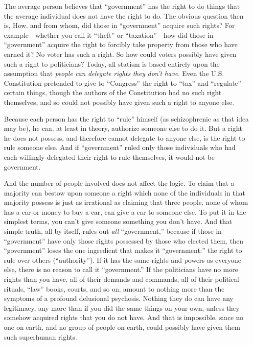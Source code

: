 \documentclass{book}
\begin{document}
The average person believes that \enquote{government} has the right to do things that the average individual does not have the right to do. The obvious question then is, How, and from whom, did those in \enquote{government} acquire such rights? For example---whether you call it \enquote{theft} or \enquote{taxation}---how did those in \enquote{government} acquire the right to forcibly take property from those who have earned it? No voter has such a right. So how could voters possibly have given such a right to politicians? Today, all statism is based entirely upon the assumption that \emph{people can delegate rights they don't have}. Even the U.S. Constitution pretended to give to \enquote{Congress} the right to \enquote{tax} and \enquote{regulate} certain things, though the authors of the Constitution had no such right themselves, and so could not possibly have given such a right to anyone else.

Because each person has the right to \enquote{rule} himself (as schizophrenic as that idea may be), he can, at least in theory, authorize someone else to do it. But a right he does not possess, and therefore cannot delegate to anyone else, is the right to rule someone else. And if \enquote{government} ruled only those individuals who had each willingly delegated their right to rule themselves, it would not be government.

And the number of people involved does not affect the logic. To claim that a majority can bestow upon someone a right which none of the individuals in that majority possess is just as irrational as claiming that three people, none of whom has a car or money to buy a car, can give a car to someone else. To put it in the simplest terms, you can't give someone something you don't have. And that simple truth, all by itself, rules out \emph{all} \enquote{government,} because if those in \enquote{government} have only those rights possessed by those who elected them, then \enquote{government} loses the one ingredient that makes it \enquote{government:} the right to rule over others (\enquote{authority}). If it has the same rights and powers as everyone else, there is no reason to call it \enquote{government.} If the politicians have no more rights than you have, all of their demands and commands, all of their political rituals, \enquote{law} books, courts, and so on, amount to nothing more than the symptoms of a profound delusional psychosis. Nothing they do can have any legitimacy, any more than if you did the same things on your own, unless they somehow acquired rights that you do not have. And that is impossible, since no one on earth, and no group of people on earth, could possibly have given them such superhuman rights.
\end{document}
